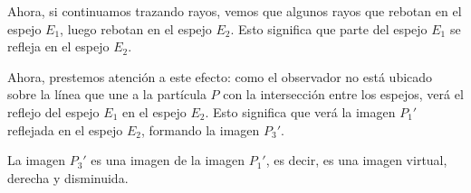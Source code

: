 Ahora, si continuamos trazando rayos, vemos que algunos rayos que rebotan en el espejo \(E_1\), luego rebotan en el espejo \(E_2\). Esto significa que parte del espejo \(E_1\) se refleja en el espejo \(E_2\).

Ahora, prestemos atención a este efecto: como el observador no está ubicado sobre la línea que une a la partícula \(P\) con la intersección entre los espejos, verá el reflejo del espejo \(E_1\) en el espejo \(E_2\). Esto significa que verá la imagen \(P_1'\) reflejada en el espejo \(E_2\), formando la imagen \(P_3'\).

La imagen \(P_3'\) es una imagen de la imagen \(P_1'\), es decir, es una imagen virtual, derecha y disminuida.